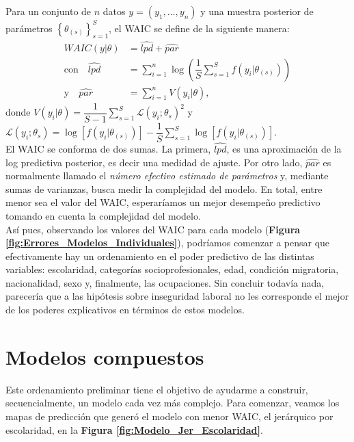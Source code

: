 Para un conjunto de $n$ datos $y=(y_1,\dots,y_n)$ y una muestra posterior de parámetros $\left\lbrace\theta_{(s)}\right\rbrace_{s=1}^S$, el WAIC se define de la siguiente manera:
\begin{align}\label{WAIC}
WAIC(y|\theta) &= \widehat{lpd} + \widehat{par} \\
\text{con} \quad \widehat{lpd} &= \sum_{i=1}^{n} \log\left(\dfrac{1}{S}\sum\limits_{s=1}^S f(y_i|\theta_{(s)}) \right) \nonumber \\
\text{y} \quad \widehat{par} &= \sum\limits_{i=1}^n V(y_i|\theta), \nonumber
\end{align}
donde $V(y_i|\theta)=\dfrac{1}{S-1}\sum\limits_{s=1}^S \mathcal{L}(y_i;\theta_{s})^2$ y $\mathcal{L}(y_i;\theta_{s}) = \log\left[f(y_i|\theta_{(s)})\right] - \dfrac{1}{S}\sum\limits_{s=1}^S \log\left[f(y_i|\theta_{(s)})\right]$.{}\\

El WAIC se conforma de dos sumas. La primera, $\widehat{lpd}$, es una aproximación de la log predictiva posterior, es decir una medidad de ajuste. Por otro lado, $\widehat{par}$ es normalmente llamado el \textit{número efectivo estimado de parámetros} y, mediante sumas de varianzas, busca medir la complejidad del modelo. En total, entre menor sea el valor del WAIC, esperaríamos un mejor desempeño predictivo tomando en cuenta la complejidad del modelo.\\

Así pues, observando los valores del WAIC para cada modelo (\textbf{Figura \ref{fig:Errores_Modelos_Individuales}}), podríamos comenzar a pensar que efectivamente hay un ordenamiento en el poder predictivo de las distintas variables: escolaridad, categorías socioprofesionales, edad, condición migratoria, nacionalidad, sexo y, finalmente, las ocupaciones. Sin concluir todavía nada, parecería que a las hipótesis sobre inseguridad laboral no les corresponde el mejor de los poderes explicativos en términos de estos modelos.

\section{Modelos compuestos}

Este ordenamiento preliminar tiene el objetivo de ayudarme a construir, secuencialmente, un modelo cada vez más complejo. Para comenzar, veamos los mapas de predicción que generó el modelo con menor WAIC, el jerárquico por escolaridad, en la \textbf{Figura \ref{fig:Modelo_Jer_Escolaridad}}.\\ 

